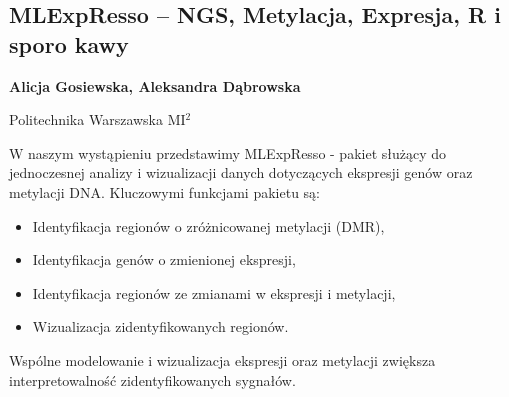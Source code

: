 \documentclass[\main/boa.tex]{subfiles}
\begin{document}
\subsection{MLExpResso – NGS, Metylacja, Expresja, R i sporo kawy}

\begin{minipage}{0.915\textwidth}
	\centering
  {\bf {} Alicja Gosiewska,  Aleksandra Dąbrowska}
\end{minipage}


\begin{affiliations}
\begin{minipage}{0.915\textwidth}
\centering
Politechnika Warszawska MI$^{2}$ \\[-2pt]
\end{minipage}
\end{affiliations}

\vskip 0.3cm

 W naszym wystąpieniu przedstawimy MLExpResso - pakiet służący do jednoczesnej analizy i wizualizacji danych dotyczących ekspresji genów oraz metylacji DNA. 
 Kluczowymi funkcjami pakietu są: 
 \begin{itemize}[noitemsep]
 \item Identyfikacja regionów o zróżnicowanej metylacji (DMR), 
 \item Identyfikacja genów o zmienionej ekspresji, 
 \item Identyfikacja regionów ze zmianami w ekspresji i metylacji,
 \item Wizualizacja zidentyfikowanych regionów.
 \end{itemize}
 
 Wspólne modelowanie i wizualizacja ekspresji oraz metylacji zwiększa interpretowalność zidentyfikowanych sygnałów.
 
\end{document}

